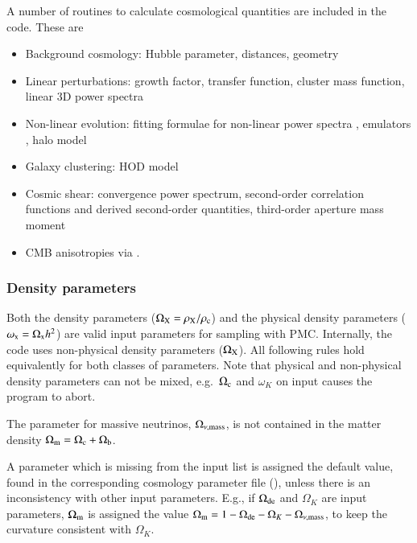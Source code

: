 \documentclass[11pt, chapterprefix, headsepline]{scrartcl}
\begin{document}
A number of routines to calculate cosmological quantities are included
in the code. These are
%
\begin{itemize}
  \item Background cosmology: Hubble parameter, distances, geometry
  \item Linear perturbations: growth factor, transfer function,
    cluster mass function, linear 3D power spectra
  \item Non-linear evolution: fitting formulae for non-linear power
    spectra \citep{PD96, 2003MNRAS.341.1311S}, emulators
    \citep{CoyoteII, CoyoteI, CoyoteIII}, halo model
  \item Galaxy clustering: HOD model
  \item Cosmic shear: convergence power spectrum, second-order
    correlation functions and derived second-order quantities,
    third-order aperture mass moment
    \item CMB anisotropies via .
\end{itemize}

\subsubsection{Density parameters}

Both the density parameters ($\Omega_{\rm X} = \rho_{\rm X}/\rho_{\rm
  c}$) and the physical density parameters ($\omega_{\rm x} =
\Omega_{\rm x} h^2$) are valid input parameters for sampling with PMC.
Internally, the code uses non-physical density parameters
($\Omega_{\rm X}$). All following rules hold equivalently for both
classes of parameters. Note that physical and non-physical density parameters can
not be mixed, e.g.~$\Omega_{\rm c}$ and $\omega_K$ on input causes the
program to abort.

The parameter for massive neutrinos, $\Omega_{\nu, {\rm mass}}$, is not contained
in the matter density $\Omega_{\rm m} = \Omega_{\rm c} + \Omega_{\rm b}$.


A parameter which is missing from the input list is assigned the
default value, found in the corresponding cosmology parameter file
(), unless there is an inconsistency with other input
parameters.
E.g., if $\Omega_{\rm de}$ and $\Omega_K$ are input parameters,
$\Omega_{\rm m}$ is assigned the value $\Omega_{\rm m} = 1 - \Omega_{\rm de} - \Omega_K -
\Omega_{\nu, {\rm mass}}$, to keep the curvature consistent with $\Omega_K$.
\end{document}
